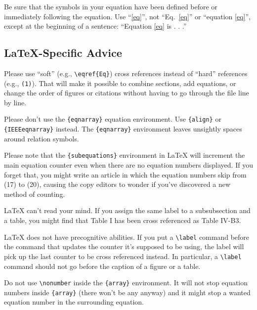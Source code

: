 \documentclass[conference]{IEEEtran}
\begin{document}
Be sure that the 
symbols in your equation have been defined before or immediately following 
the equation. Use ``\eqref{eq}'', not ``Eq.~\eqref{eq}'' or ``equation \eqref{eq}'', except at 
the beginning of a sentence: ``Equation \eqref{eq} is . . .''

\subsection{\LaTeX-Specific Advice}

Please use ``soft'' (e.g., \verb|\eqref{Eq}|) cross references instead
of ``hard'' references (e.g., \verb|(1)|). That will make it possible
to combine sections, add equations, or change the order of figures or
citations without having to go through the file line by line.

Please don't use the \verb|{eqnarray}| equation environment. Use
\verb|{align}| or \verb|{IEEEeqnarray}| instead. The \verb|{eqnarray}|
environment leaves unsightly spaces around relation symbols.

Please note that the \verb|{subequations}| environment in {\LaTeX}
will increment the main equation counter even when there are no
equation numbers displayed. If you forget that, you might write an
article in which the equation numbers skip from (17) to (20), causing
the copy editors to wonder if you've discovered a new method of
counting.


{\LaTeX} can't read your mind. If you assign the same label to a
subsubsection and a table, you might find that Table I has been cross
referenced as Table IV-B3. 

{\LaTeX} does not have precognitive abilities. If you put a
\verb|\label| command before the command that updates the counter it's
supposed to be using, the label will pick up the last counter to be
cross referenced instead. In particular, a \verb|\label| command
should not go before the caption of a figure or a table.

Do not use \verb|\nonumber| inside the \verb|{array}| environment. It
will not stop equation numbers inside \verb|{array}| (there won't be
any anyway) and it might stop a wanted equation number in the
surrounding equation.
\end{document}
